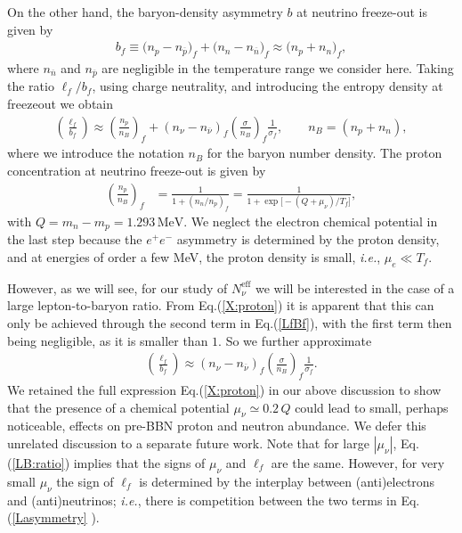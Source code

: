 On the other hand, the baryon-density asymmetry $b$ at neutrino freeze-out is given by
\begin{align}
\label{Basymmetry}
b_f \equiv\big(n_p-n_{\overline{p}}\big)_f+\big(n_n-n_{\overline{n}}\big)_f \approx \big(n_p+n_n\big)_f,
\end{align}
where $n_{\overline{n}}$ and $n_{\overline{p}}$ are negligible in the temperature range we consider here. Taking the ratio $\ell_f/b_f$, using charge neutrality, and introducing the entropy density at freezeout we obtain
\begin{align}\label{LfBf}
\left(\frac{\ell_f}{b_f}\right) 
\approx\left(\frac{n_p}{n_B} \right)_f+\left(n_{\nu}-n_{\overline{\nu}}\right)_f \left(\frac{\sigma}{n_B}\right)_f \frac{1}{\sigma_f},\qquad n_B=(n_p+n_n),
\end{align}
where we introduce the notation $n_B$ for the baryon number density. The proton concentration at neutrino freeze-out is given by
\begin{align}
\label{X:proton}
\left(\frac{n_p}{n_B}\right)_f&=\frac{1}{1+(n_n/n_p)_f}=\frac{1}{1+\exp{\big[-\left(Q+\mu_\nu\right)/T_f\big]}},
\end{align}
with $Q=m_n-m_p=1.293\,\mathrm{MeV}$. We neglect the electron chemical potential in the last step because the $e^+e^-$ asymmetry is determined by the proton density, and at energies of order a few MeV, the proton density is small, {\it i.e.\/}, $\mu_e\ll T_f$. 

However, as we will see, for our study of $N_\nu^{\mathrm{eff}}$ we will be interested in the case of a large lepton-to-baryon ratio. From Eq.\;(\ref{X:proton}) it is apparent that this can only be achieved through the second term in Eq.\;(\ref{LfBf}), with the first term then being negligible, as it is smaller than $1$. So we further approximate
\begin{align}\label{LB:ratio}
\left(\frac{\ell_f}{b_f}\right) 
\approx\left(n_{\nu}-n_{\overline{\nu}}\right)_f \left(\frac{\sigma}{n_B}\right)_f \frac{1}{\sigma_f}.
\end{align}
We retained the full expression Eq.\;(\ref{X:proton}) in our above discussion to show that the presence of a chemical potential $\mu_\nu\simeq 0.2\,Q$ could lead to small, perhaps noticeable, effects on pre-BBN proton and neutron abundance. We defer this unrelated discussion to a separate future work. Note that for large $|\mu_\nu|$, Eq.\;(\ref{LB:ratio}) implies that the signs of $\mu_\nu$ and $\ell_f$ are the same. However, for very small $\mu_\nu$ the sign of $\ell_f$ is determined by the interplay between (anti)electrons and (anti)neutrinos; {\it i.e.\/}, there is competition between the two terms in Eq.\;(\ref{Lasymmetry} ).

